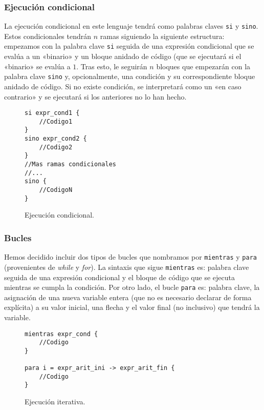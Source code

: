 \subsubsection{Ejecución condicional}
La ejecución condicional en este lenguaje tendrá como palabras claves \lstinline{si} y
\lstinline{sino}. Estos condicionales tendrán $n$ ramas siguiendo la siguiente estructura:
empezamos con la palabra clave \lstinline{si} seguida de una expresión condicional que se
evalúa a un «binario» y un bloque anidado de código (que se ejecutará si el
«binario» se evalúa a $1$. Tras esto, le seguirán $n$ bloques que empezarán con
la palabra clave \lstinline{sino} y, opcionalmente, una condición y su correspondiente
bloque anidado de código. Si no existe condición, se interpretará como un «en
caso contrario» y se ejecutará si los anteriores no lo han hecho.
\begin{figure}[htbp]
    \centering
    \begin{lstlisting}
si expr_cond1 {
    //Codigo1
}
sino expr_cond2 {
    //Codigo2
} 
//Mas ramas condicionales
//...
sino {
    //CodigoN
}
    \end{lstlisting}
    \caption{Ejecución condicional.}
\end{figure}

\subsubsection{Bucles}
Hemos decidido incluir dos tipos de bucles que nombramos por
\lstinline{mientras} y \lstinline{para}
(provenientes de \textit{while} y \textit{for}). La sintaxis que sigue
\lstinline{mientras} es: palabra clave seguida de una expresión condicional y el bloque de
código que se ejecuta mientras se cumpla la condición. Por otro lado, el bucle
\lstinline{para} es: palabra clave, la asignación de una nueva variable entera (que no es
necesario declarar de forma explícita) a su valor inicial, una flecha y el valor
final (no inclusivo) que tendrá la variable.
\begin{figure}[htbp]
    \centering
    \begin{lstlisting}
mientras expr_cond {
    //Codigo
}

para i = expr_arit_ini -> expr_arit_fin {
    //Codigo
}
    \end{lstlisting}
    \caption{Ejecución iterativa.}
\end{figure}

